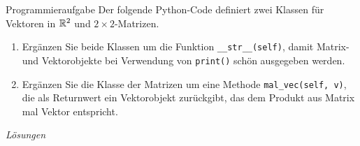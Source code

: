\begin{ueb}
    {Programmieraufgabe}{}
    Der folgende Python-Code definiert zwei Klassen für Vektoren in $\mathbb{R}^2$ und $2\times2$-Matrizen.
    
    

    \begin{enumerate}
        \item Ergänzen Sie beide Klassen um die Funktion \lstinline|__str__(self)|, damit Matrix- und Vektorobjekte bei Verwendung von \lstinline|print()| schön ausgegeben werden.
        \item Ergänzen Sie die Klasse der Matrizen um eine Methode \lstinline|mal_vec(self, v)|, die als Returnwert ein Vektorobjekt zurückgibt, das dem Produkt aus Matrix mal Vektor entspricht.
    \end{enumerate}


\end{ueb}
\clearpage
\emph{Lösungen}
